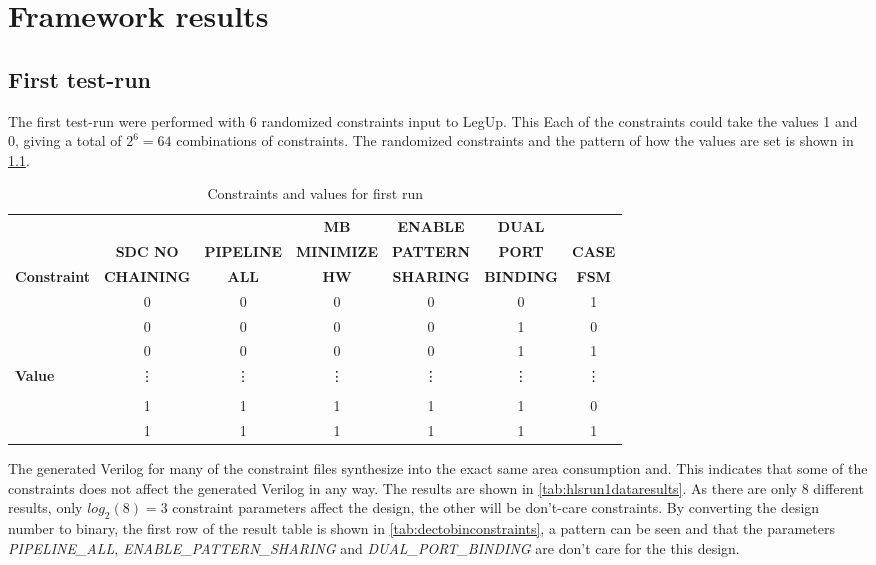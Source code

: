 \chapter{Framework results}


\section{First test-run}
The first test-run were performed with 6 randomized constraints input to LegUp. This Each of the constraints could take the values 1 and 0, giving a total of $2^6=64$ combinations of constraints. The randomized constraints and the pattern of how the values are set is shown in \cref{tab:randomconstraint}.

\begin{table}
\tiny
    \begin{center}
    \begin{tabular}{l|cccccc}
     & & & \textbf{MB} & \textbf{ENABLE} & \textbf{DUAL} & \\
          &
          \textbf{SDC NO} & 
          \textbf{PIPELINE} & 
          \textbf{MINIMIZE} & 
          \textbf{PATTERN} & 
          \textbf{PORT} &
          \textbf{CASE} \\
        \textbf{Constraint}
           & \textbf{CHAINING}
           & \textbf{ALL}
           & \textbf{HW}
           & \textbf{SHARING}
           & \textbf{BINDING}
           & \textbf{FSM}
    \\ \midrule
    & 0 & 0 & 0 & 0 & 0 & 1 \\
    & 0 & 0 & 0 & 0 & 1 & 0 \\
    & 0 & 0 & 0 & 0 & 1 & 1 \\
    \textbf{Value} & \vdots & \vdots & \vdots & \vdots & \vdots & \vdots \\
    & &  &  &  &  &  \\
    & 1 & 1 & 1 & 1 & 1 & 0 \\
    & 1 & 1 & 1 & 1 & 1 & 1
    \\ \bottomrule
    \end{tabular}
    \caption{\label{tab:randomconstraint}Constraints and values for first run}
    \end{center}
\end{table}

The generated Verilog for many of the constraint files synthesize into the exact same area consumption and. This indicates that some of the constraints does not affect the generated Verilog in any way. The results are shown in \cref{tab:hlsrun1dataresults}. As there are only 8 different results, only $log_2(8) = 3$ constraint parameters affect the design, the other will be don't-care constraints. By converting the design number to binary, the first row of the result table is shown in \cref{tab:dectobinconstraints}, a pattern can be seen and that the parameters \textit{PIPELINE\_ALL}, \textit{ENABLE\_PATTERN\_SHARING} and \textit{DUAL\_PORT\_BINDING} are don't care for the this design.



